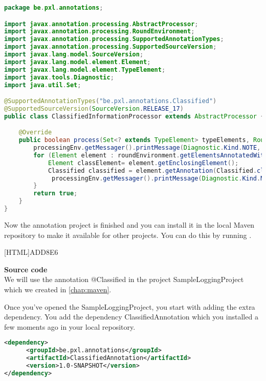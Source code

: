 \begin{lstlisting}[frame=single,language=java]
package be.pxl.annotations;

import javax.annotation.processing.AbstractProcessor;
import javax.annotation.processing.RoundEnvironment;
import javax.annotation.processing.SupportedAnnotationTypes;
import javax.annotation.processing.SupportedSourceVersion;
import javax.lang.model.SourceVersion;
import javax.lang.model.element.Element;
import javax.lang.model.element.TypeElement;
import javax.tools.Diagnostic;
import java.util.Set;

@SupportedAnnotationTypes("be.pxl.annotations.Classified")
@SupportedSourceVersion(SourceVersion.RELEASE_17)
public class ClassifiedInformationProcessor extends AbstractProcessor {

	@Override
	public boolean process(Set<? extends TypeElement> typeElements, RoundEnvironment roundEnvironment) {
		processingEnv.getMessager().printMessage(Diagnostic.Kind.NOTE, "Starting classified information processor");
		for (Element element : roundEnvironment.getElementsAnnotatedWith(Classified.class)) {
			Element classElement= element.getEnclosingElement();
			Classified classified = element.getAnnotation(Classified.class);
             processingEnv.getMessager().printMessage(Diagnostic.Kind.MANDATORY_WARNING, classElement + "#" + element + " is classified [" + classified.level()  + "]");
		}
		return true;
	}
}
\end{lstlisting}

Now the annotation project is finished and you can install it in the local Maven repository to make it available for other projects.
You can do this by running .

[HTML]{ADD8E6}{\parbox{\textwidth}{%
\noindent \textbf{Source code}\\
We will use the annotation @Classified in the project SampleLoggingProject which we created in \autoref{chap:maven}. 
}}

Once you've opened the SampleLoggingProject, you start with adding the extra dependency. You add the dependency ClassifiedAnnotation which you installed a few moments ago in your local repository.

\begin{lstlisting}[frame=single, language=xml]
<dependency>
	  <groupId>be.pxl.annotations</groupId>
	  <artifactId>ClassifiedAnnotation</artifactId>
	  <version>1.0-SNAPSHOT</version>
</dependency>
\end{lstlisting}

